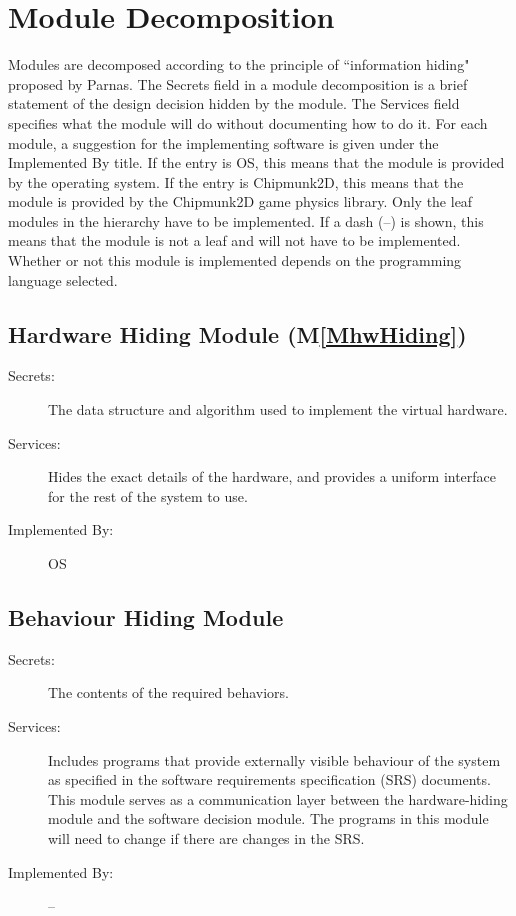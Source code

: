 \documentclass[12pt]{article}
\begin{document}
\section{Module Decomposition}
\label{Sec:MD}
Modules are decomposed according to the principle of ``information hiding" proposed by Parnas. The Secrets field in a module decomposition is a brief statement of the design decision hidden by the module. The Services field specifies what the module will do without documenting how to do it. For each module, a suggestion for the implementing software is given under the Implemented By title. If the entry is OS, this means that the module is provided by the operating system. If the entry is Chipmunk2D, this means that the module is provided by the Chipmunk2D game physics library. Only the leaf modules in the hierarchy have to be implemented. If a dash (--) is shown, this means that the module is not a leaf and will not have to be implemented. Whether or not this module is implemented depends on the programming language selected.
\subsection{Hardware Hiding Module (M\ref{MhwHiding})}
\label{Sec:HHM()}
\begin{description}
\item[Secrets:]The data structure and algorithm used to implement the virtual hardware.
\item[Services:]Hides the exact details of the hardware, and provides a uniform interface for the rest of the system to use.
\item[Implemented By:]OS
\end{description}
\subsection{Behaviour Hiding Module}
\label{Sec:BHM}
\begin{description}
\item[Secrets:]The contents of the required behaviors.
\item[Services:]Includes programs that provide externally visible behaviour of the system as specified in the software requirements specification (SRS) documents. This module serves as a communication layer between the hardware-hiding module and the software decision module. The programs in this module will need to change if there are changes in the SRS.
\item[Implemented By:]--
\end{description}
\end{document}
